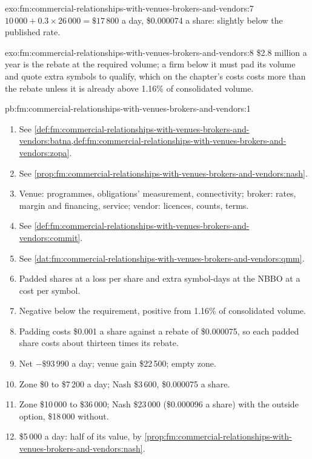 \begin{solution}{exo:fm:commercial-relationships-with-venues-brokers-and-vendors:7}
$10\,000+0.3\times26\,000=\$17\,800$ a day, \$0.000074 a share: slightly below the published rate.
\end{solution}

\begin{solution}{exo:fm:commercial-relationships-with-venues-brokers-and-vendors:8}
\$2.8 million a year is the rebate at the required volume; a firm below it must pad its volume and quote extra symbols to qualify, which on the
chapter's costs costs more than the rebate unless it is already above 1.16\% of consolidated volume.
\end{solution}

\begin{solution}{pb:fm:commercial-relationships-with-venues-brokers-and-vendors:1}
\begin{enumerate}
\item See \cref{def:fm:commercial-relationships-with-venues-brokers-and-vendors:batna,def:fm:commercial-relationships-with-venues-brokers-and-vendors:zopa}.
\item See \cref{prop:fm:commercial-relationships-with-venues-brokers-and-vendors:nash}.
\item Venue: programmes, obligations' measurement, connectivity; broker: rates, margin and financing, service; vendor: licences, counts, terms.
\item See \cref{def:fm:commercial-relationships-with-venues-brokers-and-vendors:commit}.
\item See \cref{dat:fm:commercial-relationships-with-venues-brokers-and-vendors:qmm}.
\item Padded shares at a loss per share and extra symbol-days at the NBBO at a cost per symbol.
\item Negative below the requirement, positive from 1.16\% of consolidated volume.
\item Padding costs \$0.001 a share against a rebate of \$0.000075, so each padded share costs about thirteen times its rebate.
\item Net $-\$93\,990$ a day; venue gain \$22\,500; empty zone.
\item Zone \$0 to \$7\,200 a day; Nash \$3\,600, \$0.000075 a share.
\item Zone \$10\,000 to \$36\,000; Nash \$23\,000 (\$0.000096 a share) with the outside option, \$18\,000 without.
\item \$5\,000 a day: half of its value, by \cref{prop:fm:commercial-relationships-with-venues-brokers-and-vendors:nash}.

\end{enumerate}
\end{solution}
